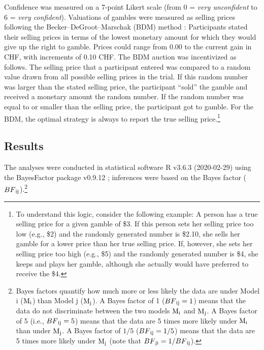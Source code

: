 \documentclass[a4paper, man, natbib, floatsintext]{apa6}
\begin{document}
Confidence was measured on a 7-point Likert scale (from 0 = \textit{very unconfident} to 6 = \textit{very confident}). Valuations of gambles were measured as selling prices following the Becker--DeGroot--Marschak (BDM) method \citep{Becker1964}: Participants stated their selling prices in terms of the lowest monetary amount for which they would give up the right to gamble. Prices could range from 0.00 to the current gain in CHF, with increments of 0.10 CHF. The BDM auction was incentivized as follows. The selling price that a participant entered was compared to a random value drawn from all possible selling prices in the trial. If this random number was larger than the stated selling price, the participant ``sold'' the gamble and received a monetary amount  the random number. If the random number was equal to or smaller than the selling price, the participant got to gamble. For the BDM, the optimal strategy is always to report the true selling price.\footnote{\label{logic.BDM}
To understand this logic, consider the following example: A person has a true selling price for a given gamble of \$3. If this person sets her selling price too low (e.g., \$2) and the randomly generated number is \$2.10, she sells her gamble for a lower price than her true selling price. If, however, she sets her selling price too high (e.g., \$5) and the randomly generated number is \$4, she keeps and plays her gamble, although she actually would have preferred to receive the \$4.
} 

\subsection{Results}
The analyses were conducted in statistical software R v3.6.3 (2020-02-29) \citep{R} using the BayesFactor package v0.9.12 \citep{BayesFactor} ; inferences were based on the Bayes factor ($BF\textsubscript{ij}$).\footnote{Bayes factors quantify how much more or less likely the data are under Model i ($\mathrm{M}\textsubscript{i}$) than Model j ($\mathrm{M}\textsubscript{j}$). A Bayes factor of 1 ($BF\textsubscript{ij} = 1$) means that the data do not discriminate between the two models $\mathrm{M}\textsubscript{i}$ and $\mathrm{M}\textsubscript{j}$. A Bayes factor of 5 (i.e., $BF\textsubscript{ij} = 5$) means that the data are 5 times more likely under $\mathrm{M}\textsubscript{i}$ than under $\mathrm{M}\textsubscript{j}$. A Bayes factor of $1/5$ ($BF\textsubscript{ij} = 1/5$) means that the data are 5 times more likely under $\mathrm{M}\textsubscript{j}$ (note that $BF\textsubscript{ji} = 1/BF\textsubscript{ij}$).} 
%

\clearpage
%
\end{document}

